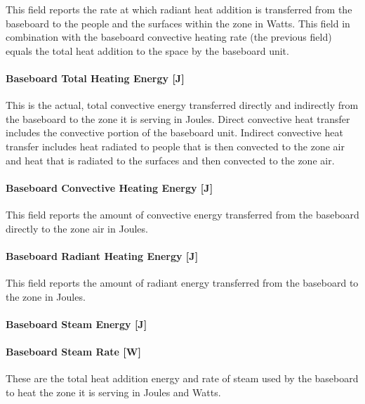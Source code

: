 This field reports the rate at which radiant heat addition is transferred from the baseboard to the people and the surfaces within the zone in Watts.  This field in combination with the baseboard convective heating rate (the previous field) equals the total heat addition to the space by the baseboard unit.

\paragraph{Baseboard Total Heating Energy {[}J{]}}\label{baseboard-total-heating-energy-j-1}

This is the actual, total convective energy transferred directly and indirectly from the baseboard to the zone it is serving in Joules. Direct convective heat transfer includes the convective portion of the baseboard unit. Indirect convective heat transfer includes heat radiated to people that is then convected to the zone air and heat that is radiated to the surfaces and then convected to the zone air.

\paragraph{Baseboard Convective Heating Energy {[}J{]}}\label{baseboard-convective-heating-energy-j-1}

This field reports the amount of convective energy transferred from the baseboard directly to the zone air in Joules.

\paragraph{Baseboard Radiant Heating Energy {[}J{]}}\label{baseboard-radiant-heating-energy-j-1}

This field reports the amount of radiant energy transferred from the baseboard to the zone in Joules.

\paragraph{Baseboard Steam Energy {[}J{]}}\label{baseboard-steam-energy-j}

\paragraph{Baseboard Steam Rate {[}W{]}}\label{baseboard-steam-rate-w}

These are the total heat addition energy and rate of steam used by the baseboard to heat the zone it is serving in Joules and Watts.

